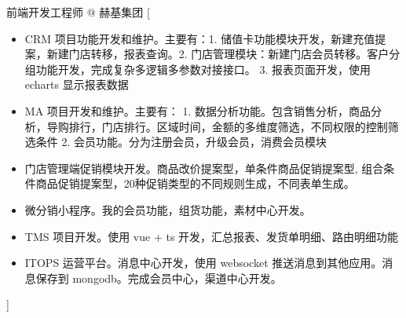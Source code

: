 \documentclass[zh]{resume}
\begin{document}
\begin{experiences}
    {前端开发工程师 @ 赫基集团}%
    [\begin{itemize}
      \item CRM 项目功能开发和维护。主要有：1. 储值卡功能模块开发，新建充值提案，新建门店转移，报表查询。2. 门店管理模块：新建门店会员转移。客户分组功能开发，完成复杂多逻辑多参数对接接口。 3. 报表页面开发，使用 echarts 显示报表数据
      \item MA 项目开发和维护。主要有： 1. 数据分析功能。包含销售分析，商品分析，导购排行，门店排行。区域时间，金额的多维度筛选，不同权限的控制筛选条件 2. 会员功能。分为注册会员，升级会员，消费会员模块
      \item 门店管理端促销模块开发。商品改价提案型，单条件商品促销提案型, 组合条件商品促销提案型，20种促销类型的不同规则生成，不同表单生成。
      \item 微分销小程序。我的会员功能，组货功能，素材中心开发。
      \item TMS 项目开发。使用 vue + ts 开发，汇总报表、发货单明细、路由明细功能
      \item ITOPS 运营平台。消息中心开发，使用 websocket 推送消息到其他应用。消息保存到 mongodb。完成会员中心，渠道中心开发。
    \end{itemize}]

\end{experiences}
\end{document}
